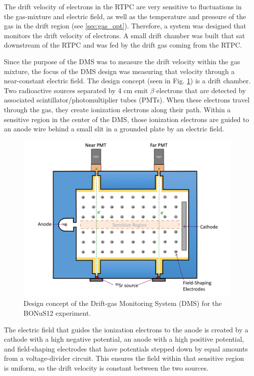 The drift velocity of electrons in the RTPC are very sensitive to fluctuations in the gas-mixture and electric field, as well as the temperature and pressure of the gas in the drift region (see \ref{sec:gas_opt}). Therefore, a system was designed that monitors the drift velocity of electrons. A small drift chamber was built that sat downstream of the RTPC and was fed by the drift gas coming from the RTPC.

Since the purpose of the DMS was to measure the drift velocity within the gas mixture, the focus of the DMS design was measuring that velocity through a near-constant electric field. The design concept (seen in Fig. \ref{fig:dms_concept}) is a drift chamber. Two radioactive sources separated by 4 cm emit $\beta$ electrons that are detected by associated scintillator/photomultiplier tubes (PMTs). When these electrons travel through the gas, they create ionization electrons along their path. Within a sensitive region in the center of the DMS, those ionization electrons are guided to an anode wire behind a small slit in a grounded plate by an electric field. 

\begin{figure}[h!]
	\centering
	\includegraphics[width=0.8\linewidth]{figures/dms_concept.png}
	\caption{Design concept of the Drift-gas Monitoring System (DMS) for the BONuS12 experiment.}
	\label{fig:dms_concept}
\end{figure}

The electric field that guides the ionization electrons to the anode is created by a cathode with a high negative potential, an anode with a high positive potential, and field-shaping electrodes that have potentials stepped down by equal amounts from a voltage-divider circuit. This ensures the field within that sensitive region is uniform, so the drift velocity is constant between the two sources.

